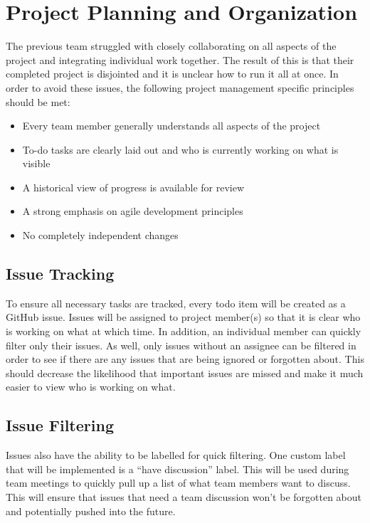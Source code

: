 \documentclass[12pt]{report}
\begin{document}
\section{Project Planning and Organization}
The previous team struggled with closely collaborating on all aspects of the project and integrating individual work together. The result of this is that their completed project is disjointed and it is unclear how to run it all at once. In order to avoid these issues, the following project management specific principles should be met:
\begin{itemize}
\itemsep0em 
    \item Every team member generally understands all aspects of the project
    \item To-do tasks are clearly laid out and who is currently working on what is visible
    \item A historical view of progress is available for review
    \item A strong emphasis on agile development principles
    \item No completely independent changes
\end{itemize}
\subsection{Issue Tracking}
To ensure all necessary tasks are tracked, every todo item will be created as a GitHub issue. Issues will be assigned to project member(s) so that it is clear who is working on what at which time. In addition, an individual member can quickly filter only their issues. As well, only issues without an assignee can be filtered in order to see if there are any issues that are being ignored or forgotten about. This should decrease the likelihood that important issues are missed and make it much easier to view who is working on what.
\subsection{Issue Filtering}
Issues also have the ability to be labelled for quick filtering. One custom label that will be implemented is a “have discussion” label. This will be used during team meetings to quickly pull up a list of what team members want to discuss. This will ensure that issues that need a team discussion won’t be forgotten about and potentially pushed into the future.
\end{document}
